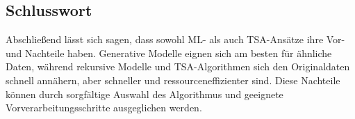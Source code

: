 \subsection{Schlusswort}
Abschließend lässt sich sagen, dass sowohl ML- als auch TSA-Ansätze ihre Vor- und Nachteile haben. Generative Modelle eignen sich am besten für ähnliche Daten, während rekursive Modelle und TSA-Algorithmen 
sich den Originaldaten schnell annähern, aber schneller und ressourceneffizienter sind. Diese Nachteile können durch sorgfältige Auswahl des Algorithmus und geeignete Vorverarbeitungsschritte ausgeglichen werden.